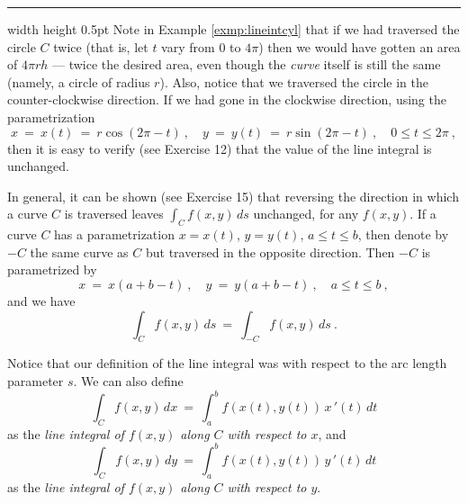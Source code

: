 \hrule width \textwidth height 0.5pt
\medskip
Note in Example \ref{exmp:lineintcyl} that if we had traversed the circle $C$ twice 
(that is, let $t$ vary from $0$ to $4\pi$) 
then we would have gotten an area of $4\pi r h$ --- twice the desired area, even though the \emph{curve}
itself is still the same (namely, a circle of radius $r$). Also, notice that we traversed the circle in the
counter-clockwise direction. If we had gone in the clockwise direction, using the parametrization
\begin{equation}\label{eqn:lineintcylcwise}
 x ~=~ x(t) ~=~ r \cos (2\pi - t) ~,\quad y ~=~ y(t) ~=~ r \sin (2\pi - t)~,\quad 0 \le t \le 2\pi ~,
\end{equation}
then it is easy to verify (see Exercise 12) that the value of the line integral is unchanged.

In general, it can be shown
(see Exercise 15) that reversing the direction in which a curve $C$ is traversed leaves $\int_C f(x,y)\,ds$ unchanged,
for any $f(x,y)$. If a curve $C$ has a parametrization $x=x(t)$, $y=y(t)$, $a \le t \le b$, then denote by $-C$ the
same curve as $C$ but traversed in the opposite direction. Then $-C$ is parametrized by
\begin{equation}\label{eqn:reversec}
 x ~=~ x(a+b-t)~,\quad y ~=~ y(a+b-t)~,\quad a \le t \le b ~,
\end{equation}
and we have
\begin{equation}
 \int_C f(x,y)\,ds ~=~ \int_{-C} f(x,y)\,ds ~.
\end{equation}

Notice that our definition of the line integral was with respect to the arc length parameter $s$. We can also
define
\begin{equation}\label{eqn:lineintx2}
 \int_C f(x,y)\,dx ~=~ \int_a^b f(x(t),y(t)) \,x\,'(t)\,dt
\end{equation}
as the \emph{line integral of $f(x,y)$ along $C$ with respect to $x$}, and
\begin{equation}\label{eqn:lineinty2}
 \int_C f(x,y)\,dy ~=~ \int_a^b f(x(t),y(t)) \,y\,'(t)\,dt
\end{equation}
as the \emph{line integral of $f(x,y)$ along $C$ with respect to $y$}.

